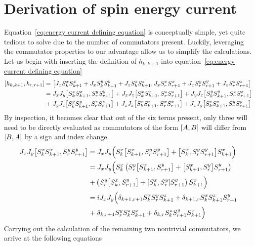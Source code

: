 \chapter{Derivation of spin energy current\label{app:spin energy current derivation}}
\thispagestyle{chapterBeginStyle}

Equation~\eqref{eq:energy current defining equation} is
conceptually simple, yet quite tedious to solve due to the number of commutators present. Luckily, leveraging the commutator properties
to our advantage allow us to simplify the calculations. Let us begin with inserting the definition of \(h_{k,k+1}\) into 
equation~\eqref{eq:energy current defining equation}
\begin{align}
    \comm{h_{k,k+1}}{h_{r,r+1}} =& \; \comm{J_{x} \Sx_{k}\Sx_{k+1} + J_{x} \Sy_{k}\Sy_{k+1} + J_{z} \Sz_{k}\Sz_{k+1}}{J_{x} \Sx_{r}\Sx_{r+1} + J_{x} \Sy_{r}\Sy_{r+1} + J_{z} \Sz_{r}\Sz_{r+1}}\nonumber\\
    =& \; J_{x} J_{y}\comm{\Sx_{k}\Sx_{k+1}}{\Sy_{r}\Sy_{r+1}} + J_{x} J_{z}\comm{\Sx_{k}\Sx_{k+1}}{\Sz_{r}\Sz_{r+1}} + J_{y} J_{x}\comm{\Sy_{k}\Sy_{k+1}}{\Sx_{r}\Sx_{r+1}}\nonumber\\
    +& \; J_{y} J_{z}\comm{\Sy_{k}\Sy_{k+1}}{\Sz_{r}\Sz_{r+1}} + J_{z} J_{x}\comm{\Sz_{k}\Sz_{k+1}}{\Sx_{r}\Sx_{r+1}} + J_{z} J_{y}\comm{\Sz_{k}\Sz_{k+1}}{\Sy_{r}\Sy_{r+1}}  
\end{align}
By inspection, it becomes clear that out of the six terms present, only three will need to be directly evaluated as commutators of the form
\(\comm{A}{B}\) will differ from \(\comm{B}{A}\) by a sign and index change.
\begin{align}
    J_{x} J_{y}\comm{\Sx_{k}\Sx_{k+1}}{\Sy_{r}\Sy_{r+1}} =& \; J_x J_y \Big(\Sx_k\comm{\Sx_{k+1}}{\Sy_{r}\Sy_{r+1}} + \comm{\Sx_{k}}{\Sy_{r}\Sy_{r+1}} \Sx_{k+1} \Big) \nonumber \\
    =& \; J_x J_y \Big( \Sx_k \left( \Sy_r \comm{\Sx_{k+1}}{\Sy_{r+1}} + \comm{\Sx_{k+1}}{\Sy_{r}} \Sy_{r+1}\right)\nonumber\\
    +& \left( \Sy_r \comm{\Sx_{k}}{\Sy_{r+1}} + \comm{\Sx_{k}}{\Sy_{r}} \Sy_{r+1} \right)\Sx_{k+1} \Big)\nonumber\\
    =& \; i J_x J_y \Big( \delta_{k+1,r+1} \Sx_k \Sy_r \Sz_{k+1} + \delta_{k+1,r} \Sx_k \Sz_{k+1} \Sy_{r+1} \nonumber\\
    +&\; \delta_{k,r+1} \Sy_r \Sz_k \Sx_{k+1} +\delta_{k,r} \Sz_k \Sy_{r+1} \Sx_{k+1}\Big)
\end{align}
Carrying out the calculation of the remaining two nontrivial commutators, we arrive at the following equations
